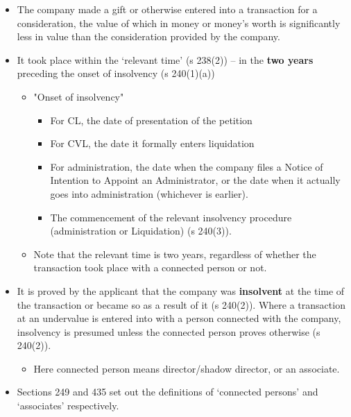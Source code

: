\documentclass[
]{article}
\providecommand{\tightlist}{%
  \setlength{\itemsep}{0pt}\setlength{\parskip}{0pt}}
\begin{document}
\begin{itemize}
\tightlist
\item
  The company made a gift or otherwise entered into a transaction for a
  consideration, the value of which in money or money's worth is
  significantly less in value than the consideration provided by the
  company.
\item
  It took place within the `relevant time' (s 238(2)) -- in the
  \textbf{two years} preceding the onset of insolvency (s 240(1)(a))

  \begin{itemize}
  \tightlist
  \item
    "Onset of insolvency"

    \begin{itemize}
    \tightlist
    \item
      For CL, the date of presentation of the petition
    \item
      For CVL, the date it formally enters liquidation
    \item
      For administration, the date when the company files a Notice of
      Intention to Appoint an Administrator, or the date when it
      actually goes into administration (whichever is earlier).
    \item
      The commencement of the relevant insolvency procedure
      (administration or Liquidation) (s 240(3)).
    \end{itemize}
  \item
    Note that the relevant time is two years, regardless of whether the
    transaction took place with a connected person or not.
  \end{itemize}
\item
  It is proved by the applicant that the company was \textbf{insolvent}
  at the time of the transaction or became so as a result of it (s
  240(2)). Where a transaction at an undervalue is entered into with a
  person connected with the company, insolvency is presumed unless the
  connected person proves otherwise (s 240(2)).

  \begin{itemize}
  \tightlist
  \item
    Here connected person means director/shadow director, or an
    associate.
  \end{itemize}
\item
  Sections 249 and 435 set out the definitions of `connected persons'
  and `associates' respectively.
\end{itemize}
\end{document}
